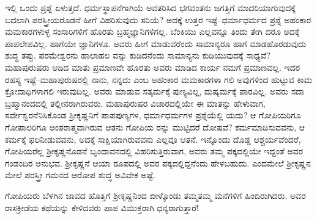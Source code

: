 ಇಲ್ಲಿ ಒಂದು ಪ್ರಶ್ನೆ ಏಳುತ್ತದೆ. ಧರ್ಮಸ್ಥಾಪನೆಗಾಗಿಯೆ ಅವತರಿಸಿದ ಭಗವಂತನು ಜಗತ್ತಿಗೆ ಮಾದರಿಯಾಗುವುದಕ್ಕೆ ಬದಲಾಗಿ ಪರಸ್ತ್ರೀಯರೊಡನೆ ಹೀಗೆ ವಿಹರಿಸುವುದು ಸರಿಯೆ? ಅದಕ್ಕೆ ಉತ್ತರ ಇಷ್ಟೆ–ಧರ್ಮಾಧರ್ಮದ ಪ್ರಶ್ನೆ ಅಹಂಕಾರ ಮಮಕಾರಗಳುಳ್ಳ ಸಂಸಾರಿಗಳಿಗೆ ಹೊರತು ಬ್ರಹ್ಮಜ್ಞಾನಿಗಳಿಗಲ್ಲ. ಬೆಂಕಿಯು ಎಲ್ಲವನ್ನೂ ತಿಂದು ತೇಗಿ ದರೂ ಅದಕ್ಕೆ ಪಾಪಲೇಪವಿಲ್ಲ. ಹಾಗೆಯೇ ಜ್ಞಾನಿಗಳೂ. ಅವರು ಹೀಗೆ ಮಾಡುವರೆಂದು ಸಾಮಾನ್ಯರೂ ಹಾಗೆ ಮಾಡಹೊರಡುವುದು ಶುದ್ಧ ತಪ್ಪು. ಪರಮೇಶ್ವರನು ಹಾಲಾಹಲ ವನ್ನು ಕುಡಿದನೆಂದು ಸಾಮಾನ್ಯನು ಕುಡಿಯುವುದಕ್ಕೆ ಸಾಧ್ಯವೆ? ಮಹಾಪುರುಷರು ಆಡಿದ ಮಾತು ಪ್ರಮಾಣವೇ ಹೊರತು ಅವರು ಮಾಡಿದ ಕಾರ್ಯ ನಮಗೆ ಪ್ರಮಾಣವಲ್ಲ. ಇದರ ರಹಸ್ಯ ಇಷ್ಟೆ–ಮಹಾಪುರುಷರಲ್ಲಿ ನಾನು, ನನ್ನದು ಎಂಬ ಅಹಂಕಾರ ಮಮಕಾರಗಳಾ ಗಲಿ ಅವುಗಳಿಂದ ಹುಟ್ಟುವ ಕಾಮ ಕ್ರೋದಾಧಿಗಳಾಗಲಿ ಇರುವುದಿಲ್ಲ. ಅವರು ಮಾಡುವ ಸತ್ಕರ್ಮಕ್ಕೆ ಪುಣ್ಯವಿಲ್ಲ, ದುಷ್ಕರ್ಮಕ್ಕೆ ಪಾರವಿಲ್ಲ. ಅವರು ಸದಾ ಬ್ರಹ್ಮಾನಂದದಲ್ಲಿ ತಲ್ಲೀನರಾಗಿರುವರು. ಮಹಾಪುರುಷರ ವಿಚಾರದಲ್ಲಿಯೇ ಈ ಮಾತನ್ನು ಹೇಳುವಾಗ, ಸರ್ವೇಶ್ವರನೆನಿಸಿಕೊಂಡ ಶ್ರೀಕೃಷ್ಣನಿಗೆ ಪಾಪಪುಣ್ಯಗಳ, ಧರ್ಮಾಧರ್ಮಗಳ ಪ್ರಶ್ನೆಯೆಲ್ಲಿ ಯದು? ಆ ಗೋಪಿಯರಿಗೂ ಗೋಪಾಲರಿಗೂ ಅಂತರಾತ್ಮವಾಗಿರುವ ಆತನು ಗೋಪಿಯ ರನ್ನು ಮುಟ್ಟಿದರೆ ದೋಷವೆ? ಕರ್ಮಮಾಡಿಸುವವನು, ಆ ಕರ್ಮಕ್ಕೆ ಫಲನೀಡುವವನು, ಅದಕ್ಕೆ ಸಾಕ್ಷಿಯಾಗಿರುವವನು ಎಲ್ಲವೂ ಆತನೆ. ಇನ್ನೊಂದು ದೊಡ್ಡ ಆಶ್ಚರ್ಯವೆಂದರೆ, ಗೋಪಿಯರೆಲ್ಲ ಶ್ರೀಕೃಷ್ಣನೊಡನೆ ಬೃಂದಾವನದಲ್ಲಿ ವಿಹರಿಸುತ್ತಿರುವಾಗ, ಅವರು ತಮ್ಮ ಪಕ್ಕದಲ್ಲಿಯೇ ಇದ್ದಂತೆ ಅವರ ಗಂಡಂದಿರ ಅನುಭವ. ಶ್ರೀಕೃಷ್ಣನೆ ಆಯಾ ರೂಪದಲ್ಲಿ ಅವರ ಪಕ್ಕದಲ್ಲಿದ್ದನೆಂದು ಹೇಳಬಹುದು. ಎಂದಮೇಲೆ ಶ್ರೀಕೃಷ್ಣನ ಮೇಲೆ ಪರಸ್ತ್ರೀ ಗಮನದ ಆರೋಪ ಶುದ್ಧ ಅವಿವೇಕ ಅಷ್ಟೆ.

ಗೋಪಿಯರು ಬೆಳಗಿನ ಜಾವದ ಹೊತ್ತಿಗೆ ಶ್ರೀಕೃಷ್ಣನಿಂದ ಬೀಳ್ಕೊಂಡು ತಮ್ಮತಮ್ಮ ಮನೆಗಳಿಗೆ ಹಿಂದಿರುಗಿದರು. ಅವರ ರಾಸಕ್ರೀಡೆಯ ಕಥೆಯನ್ನು ಕೇಳಿದವರು ಪಾಪ ವಿಮುಕ್ತರಾಗಿ ಧನ್ಯರಾಗುತ್ತಾರೆ!

